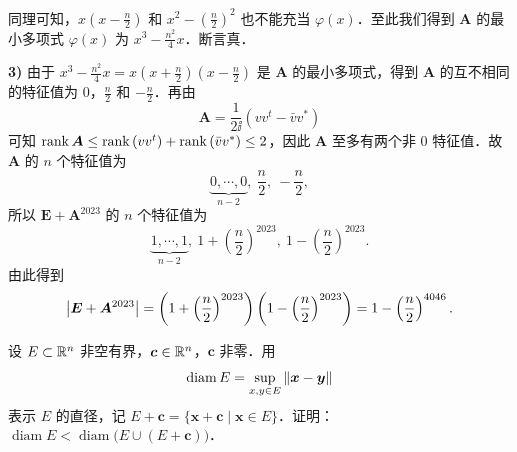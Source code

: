 \begin{solution}
同理可知，$x\left(x-\frac{n}{2}\right)$ 和 $x^{2}-\left(\frac{n}{2}\right)^{2}$ 也不能充当 $\varphi(x)$．至此我们得到 $\bm{A}$ 的最小多项式 $\varphi(x)$ 为 $x^{3}-\frac{n^{2}}{4}x$．断言真．

\textbf{3)} 由于 $x^{3}-\frac{n^{2}}{4}x=x\left(x+\frac{n}{2}\right)\left(x-\frac{n}{2}\right)$ 是 $\bm{A}$ 的最小多项式，得到 $\bm{A}$ 的互不相同的特征值为 $0$，$\frac{n}{2}$ 和 $-\frac{n}{2}$．再由
\[
\bm{A}=\frac{1}{2\ii}\left(vv^{t}-\bar{v}v^{*}\right)
\]
可知 $\operatorname{rank}\bm{A}\le\operatorname{rank}\left(vv^{t}\right)+\operatorname{rank}\left(\bar{v}v^{*}\right)\le 2$，因此 $\bm{A}$ 至多有两个非 $0$ 特征值．故 $\bm{A}$ 的 $n$ 个特征值为
\[
\underbrace{0,\cdots,0}_{n-2},\ \frac{n}{2},\ -\frac{n}{2},
\]
所以 $\bm{E}+\bm{A}^{2023}$ 的 $n$ 个特征值为
\[
\underbrace{1,\cdots,1}_{n-2},\ 1+\left(\frac{n}{2}\right)^{2023},\ 1-\left(\frac{n}{2}\right)^{2023}.
\]
由此得到
\[
\left|\bm{E}+\bm{A}^{2023}\right|=\left(1+\left(\frac{n}{2}\right)^{2023}\right)\left(1-\left(\frac{n}{2}\right)^{2023}\right)=1-\left(\frac{n}{2}\right)^{4046}.
\]
\end{solution}

设 $E\subset\mathbb{R}^{n}$ 非空有界，$\bm{c}\in\mathbb{R}^{n}$，$\bm{c}$ 非零．用
\[
  \operatorname{diam}E=\sup_{x,y\in E}\left\|\bm{x}-\bm{y}\right\|
\]
表示 $E$ 的直径，记 $E+\bm{c}=\{\bm{x}+\bm{c}\mid \bm{x}\in E\}$．证明：$\operatorname{diam}E<\operatorname{diam}\bigl(E\cup(E+\bm{c})\bigr)$．

